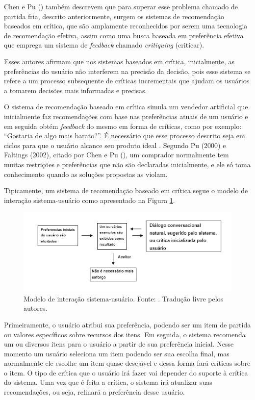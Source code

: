 Chen e Pu (\citeyear{Chen:2012}) também descrevem que para superar esse problema chamado de partida fria, descrito anteriormente, surgem os sistemas de recomendação baseados em crítica, que são amplamente reconhecidos por serem uma tecnologia de recomendação efetiva, assim como uma busca baseada em preferência efetiva que emprega um sistema de \textit{feedback} chamado \textit{critiquing} (criticar).

Esses autores afirmam que nos sistemas baseados em crítica, inicialmente, as preferências do usuário não interferem na precisão da decisão, pois esse sistema se refere a um processo subsequente de críticas incrementais que ajudam os usuários a tomarem decisões mais informadas e precisas.

O sistema de recomendação baseado em crítica simula um vendedor artificial que inicialmente faz recomendações com base nas preferências atuais de um usuário e em seguida obtém \textit{feedback} do mesmo em forma de críticas, como por exemplo: “Gostaria de algo mais barato?”. É necessário que esse processo descrito seja em ciclos para que o usuário alcance seu produto ideal \cite{Chen:2012}. Segundo Pu (2000) e Faltings (2002), citado por Chen e Pu (\citeyear{Chen:2012}), um comprador normalmente tem muitas restrições e preferências que não são declaradas inicialmente, e ele só toma conhecimento quando as soluções propostas as violam.

Tipicamente, um sistema de recomendação baseado em crítica segue o modelo de interação sistema-usuário como apresentado na Figura \ref{fig:sistema_usuario}.

\begin{figure}[H]
    \centering
    \includegraphics[scale=0.75]{figuras/referencial_teorico/sistema_usuario.png}
    \caption[Modelo de interação sistema-usuário]{Modelo de interação sistema-usuário. Fonte: \cite{Chen:2012}. Tradução livre pelos autores.}
    \label{fig:sistema_usuario}
\end{figure}

Primeiramente, o usuário atribui sua preferência, podendo ser um item de partida ou valores específicos sobre recursos dos itens. Em seguida, o sistema recomenda um ou diversos itens para o usuário a partir de sua preferência inicial. Nesse momento um usuário seleciona um item podendo ser sua escolha final, mas normalmente ele escolhe um item quase desejável e dessa forma fará críticas sobre o item. O tipo de crítica que o usuário irá fazer vai depender do suporte à crítica do sistema. Uma vez que é feita a crítica, o sistema irá atualizar suas recomendações, ou seja, refinará a preferência desse usuário.

